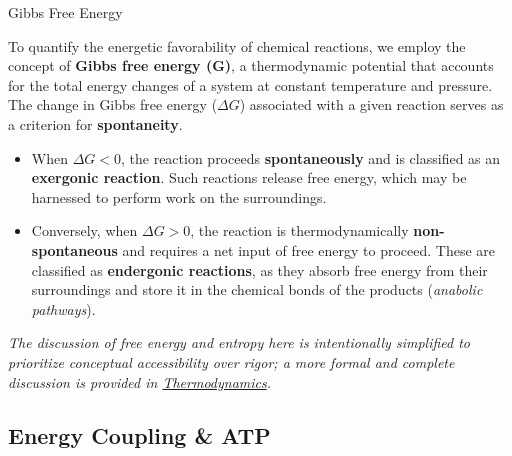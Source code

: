\documentclass[10pt]{article}
\begin{document}
    \begin{core}{Gibbs Free Energy}

      To quantify the energetic favorability of chemical reactions, we employ the concept of \textbf{Gibbs free energy (G)}, a thermodynamic potential that accounts for the total energy changes of a system at constant temperature and pressure. The change in Gibbs free energy ($\Delta G$) associated with a given reaction serves as a criterion for \textbf{spontaneity}.

      \begin{itemize}

        \item When $\Delta G < 0$, the reaction proceeds \textbf{spontaneously} and is classified as an \textbf{exergonic reaction}. Such reactions release free energy, which may be harnessed to perform work on the surroundings.


        \item Conversely, when $\Delta G > 0$, the reaction is thermodynamically \textbf{non-spontaneous} and requires a net input of free energy to proceed. These are classified as \textbf{endergonic reactions}, as they absorb free energy from their surroundings and store it in the chemical bonds of the products (\textit{anabolic pathways}).


      \end{itemize}

    \end{core}

    \textit{The discussion of free energy and entropy here is intentionally simplified to prioritize conceptual accessibility over rigor; a more formal and complete discussion is provided in \href{../../chemistry/thermodynamics/thermodynamics.pdf}{Thermodynamics}.}

  \subsection{Energy Coupling \& ATP}
\end{document}
